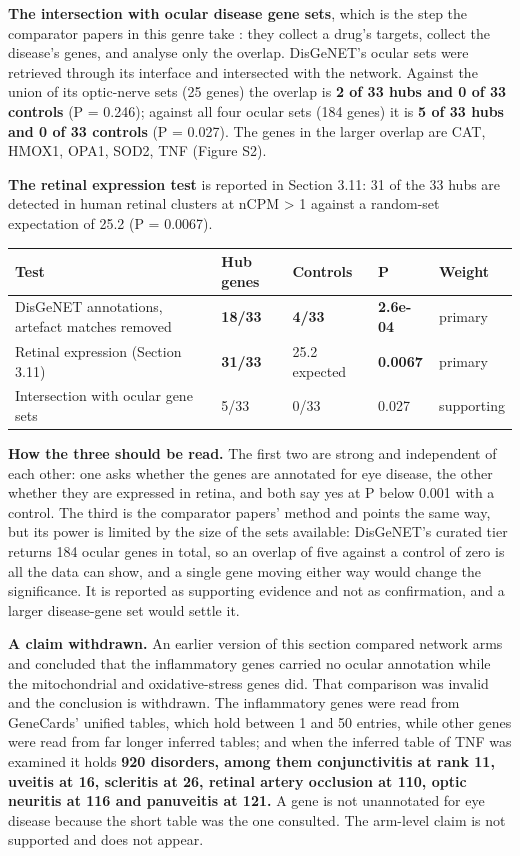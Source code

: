 \documentclass[utf8]{FrontiersinVancouver}
\begin{document}
\textbf{The intersection with ocular disease gene sets}, which is the step the comparator papers in this genre take \citep{f2026}: they collect a drug's targets, collect the disease's genes, and analyse only the overlap. DisGeNET's ocular sets were retrieved through its interface and intersected with the network. Against the union of its optic-nerve sets (25 genes) the overlap is \textbf{2 of 33 hubs and 0 of 33 controls} (P = 0.246); against all four ocular sets (184 genes) it is \textbf{5 of 33 hubs and 0 of 33 controls} (P = 0.027). The genes in the larger overlap are CAT, HMOX1, OPA1, SOD2, TNF (Figure S2).

\textbf{The retinal expression test} is reported in Section 3.11: 31 of the 33 hubs are detected in human retinal clusters at nCPM > 1 against a random-set expectation of 25.2 (P = 0.0067).

\begin{table}[htbp]
\centering
\begin{tabular}{lllll}
\hline
Test & Hub genes & Controls & P & Weight \\
\hline
DisGeNET annotations, artefact matches removed & \textbf{18/33} & \textbf{4/33} & \textbf{2.6e-04} & primary \\
Retinal expression (Section 3.11) & \textbf{31/33} & 25.2 expected & \textbf{0.0067} & primary \\
Intersection with ocular gene sets & 5/33 & 0/33 & 0.027 & supporting \\
\hline
\end{tabular}
\end{table}

\textbf{How the three should be read.} The first two are strong and independent of each other: one asks whether the genes are annotated for eye disease, the other whether they are expressed in retina, and both say yes at P below 0.001 with a control. The third is the comparator papers' method and points the same way, but its power is limited by the size of the sets available: DisGeNET's curated tier returns 184 ocular genes in total, so an overlap of five against a control of zero is all the data can show, and a single gene moving either way would change the significance. It is reported as supporting evidence and not as confirmation, and a larger disease-gene set would settle it.

\textbf{A claim withdrawn.} An earlier version of this section compared network arms and concluded that the inflammatory genes carried no ocular annotation while the mitochondrial and oxidative-stress genes did. That comparison was invalid and the conclusion is withdrawn. The inflammatory genes were read from GeneCards' unified tables, which hold between 1 and 50 entries, while other genes were read from far longer inferred tables; and when the inferred table of TNF was examined it holds \textbf{920 disorders, among them conjunctivitis at rank 11, uveitis at 16, scleritis at 26, retinal artery occlusion at 110, optic neuritis at 116 and panuveitis at 121.} A gene is not unannotated for eye disease because the short table was the one consulted. The arm-level claim is not supported and does not appear.
\end{document}
